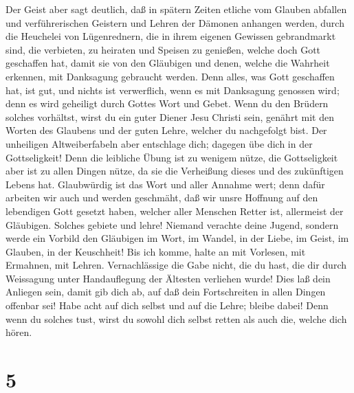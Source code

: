  Der Geist aber sagt deutlich, daß in spätern Zeiten
etliche vom Glauben abfallen und verführerischen Geistern und Lehren der
Dämonen anhangen werden,  durch die Heuchelei von
Lügenrednern, die in ihrem eigenen Gewissen gebrandmarkt sind,
 die verbieten, zu heiraten und Speisen zu genießen,
welche doch Gott geschaffen hat, damit sie von den Gläubigen und denen,
welche die Wahrheit erkennen, mit Danksagung gebraucht werden.
 Denn alles, was Gott geschaffen hat, ist gut, und nichts
ist verwerflich, wenn es mit Danksagung genossen wird; 
denn es wird geheiligt durch Gottes Wort und Gebet.  Wenn
du den Brüdern solches vorhältst, wirst du ein guter Diener Jesu Christi
sein, genährt mit den Worten des Glaubens und der guten Lehre, welcher
du nachgefolgt bist.  Der unheiligen Altweiberfabeln aber
entschlage dich; dagegen übe dich in der Gottseligkeit! 
Denn die leibliche Übung ist zu wenigem nütze, die Gottseligkeit aber
ist zu allen Dingen nütze, da sie die Verheißung dieses und des
zukünftigen Lebens hat.  Glaubwürdig ist das Wort und
aller Annahme wert;  denn dafür arbeiten wir auch und
werden geschmäht, daß wir unsre Hoffnung auf den lebendigen Gott gesetzt
haben, welcher aller Menschen Retter ist, allermeist der Gläubigen.
 Solches gebiete und lehre!  Niemand
verachte deine Jugend, sondern werde ein Vorbild den Gläubigen im Wort,
im Wandel, in der Liebe, im Geist, im Glauben, in der Keuschheit!
 Bis ich komme, halte an mit Vorlesen, mit Ermahnen, mit
Lehren.  Vernachlässige die Gabe nicht, die du hast, die
dir durch Weissagung unter Handauflegung der Ältesten verliehen wurde!
 Dies laß dein Anliegen sein, damit gib dich ab, auf daß
dein Fortschreiten in allen Dingen offenbar sei!  Habe
acht auf dich selbst und auf die Lehre; bleibe dabei! Denn wenn du
solches tust, wirst du sowohl dich selbst retten als auch die, welche
dich hören.

\hypertarget{section-4}{%
\section{5}\label{section-4}}

